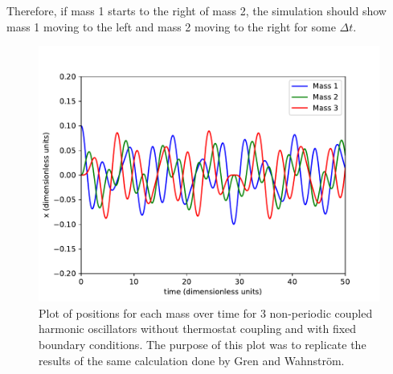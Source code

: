 \documentclass{article}
\begin{document}
Therefore, if mass 1 starts to the right of mass 2, the simulation should show mass 1 moving to the left and mass 2 moving to the right for some $\Delta t$.
\begin{figure}[H]
  \centering
  \includegraphics[scale=0.7]{Figures/1dverlet/3part_2walls.pdf}
    \caption{Plot of positions for each mass over time for 3 non-periodic coupled harmonic oscillators without thermostat coupling and with fixed boundary conditions. The purpose of this plot was to replicate the results of the same calculation done by Gren and Wahnstr\"om.\cite{gren}}
\end{figure}
\end{document}

